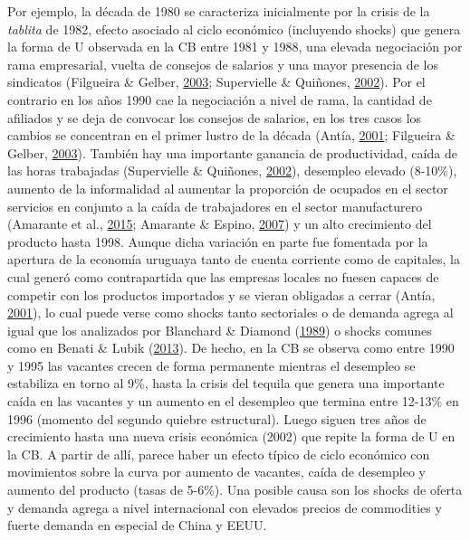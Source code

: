 \documentclass[12pt,oneside]{reedthesis}
\begin{document}
Por ejemplo, la década de 1980 se caracteriza inicialmente por la crisis de la \emph{tablita} de 1982, efecto asociado al ciclo económico (incluyendo shocks) que genera la forma de U observada en la CB entre 1981 y 1988, una elevada negociación por rama empresarial, vuelta de consejos de salarios y una mayor presencia de los sindicatos (Filgueira \& Gelber, \protect\hyperlink{ref-Filgueira2003}{2003}; Supervielle \& Quiñones, \protect\hyperlink{ref-Quinones2001}{2002}). Por el contrario en los años 1990 cae la negociación a nivel de rama, la cantidad de afiliados y se deja de convocar los consejos de salarios, en los tres casos los cambios se concentran en el primer lustro de la década (Antía, \protect\hyperlink{ref-Antia2001}{2001}; Filgueira \& Gelber, \protect\hyperlink{ref-Filgueira2003}{2003}). También hay una importante ganancia de productividad, caída de las horas trabajadas (Supervielle \& Quiñones, \protect\hyperlink{ref-Quinones2001}{2002}), desempleo elevado (8-10\%), aumento de la informalidad al aumentar la proporción de ocupados en el sector servicios en conjunto a la caída de trabajadores en el sector manufacturero (Amarante et al., \protect\hyperlink{ref-Amarante2015}{2015}; Amarante \& Espino, \protect\hyperlink{ref-Amarante2007}{2007}) y un alto crecimiento del producto hasta 1998. Aunque dicha variación en parte fue fomentada por la apertura de la economía uruguaya tanto de cuenta corriente como de capitales, la cual generó como contrapartida que las empresas locales no fuesen capaces de competir con los productos importados y se vieran obligadas a cerrar (Antía, \protect\hyperlink{ref-Antia2001}{2001}), lo cual puede verse como shocks tanto sectoriales o de demanda agrega al igual que los analizados por Blanchard \& Diamond (\protect\hyperlink{ref-Blanchard1989}{1989}) o shocks comunes como en Benati \& Lubik (\protect\hyperlink{ref-Benati2013}{2013}). De hecho, en la CB se observa como entre 1990 y 1995 las vacantes crecen de forma permanente mientras el desempleo se estabiliza en torno al 9\%, hasta la crisis del tequila que genera una importante caída en las vacantes y un aumento en el desempleo que termina entre 12-13\% en 1996 (momento del segundo quiebre estructural). Luego siguen tres años de crecimiento hasta una nueva crisis económica (2002) que repite la forma de U en la CB. A partir de allí, parece haber un efecto típico de ciclo económico con movimientos sobre la curva por aumento de vacantes, caída de desempleo y aumento del producto (tasas de 5-6\%). Una posible causa son los shocks de oferta y demanda agrega a nivel internacional con elevados precios de commodities y fuerte demanda en especial de China y EEUU.
\end{document}
